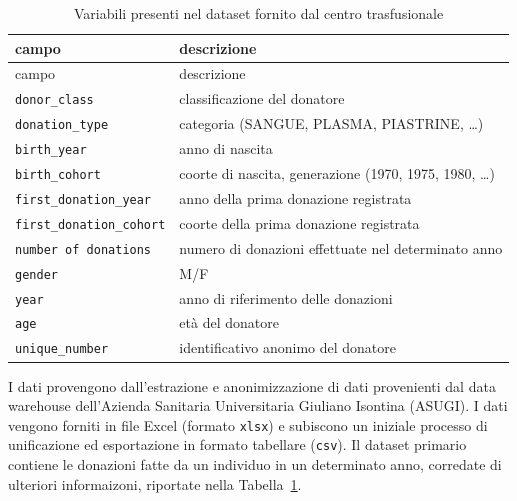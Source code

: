 \documentclass[
  italian,
  a4paper,
  a4paper,
  twoside,
  open=right,
  12pt]{scrbook}
\theoremstyle{definition}
\theoremstyle{remark}
\begin{document}
\begin{longtable}[]{@{}
  >{\raggedright\arraybackslash}p{}
  >{\raggedright\arraybackslash}p{}@{}}
\caption{Variabili presenti nel dataset fornito dal centro
trasfusionale}\label{tbl-struttura_dati}\tabularnewline
\toprule\noalign{}
\begin{minipage}[b]{\linewidth}\raggedright
campo
\end{minipage} & \begin{minipage}[b]{\linewidth}\raggedright
descrizione
\end{minipage} \\
\midrule\noalign{}
\endfirsthead
\toprule\noalign{}
\begin{minipage}[b]{\linewidth}\raggedright
campo
\end{minipage} & \begin{minipage}[b]{\linewidth}\raggedright
descrizione
\end{minipage} \\
\midrule\noalign{}
\endhead
\bottomrule\noalign{}
\endlastfoot
\texttt{donor\_class} & classificazione del donatore \\
\texttt{donation\_type} & categoria (SANGUE, PLASMA, PIASTRINE,
\ldots) \\
\texttt{birth\_year} & anno di nascita \\
\texttt{birth\_cohort} & coorte di nascita, generazione (1970, 1975,
1980, \ldots) \\
\texttt{first\_donation\_year} & anno della prima donazione
registrata \\
\texttt{first\_donation\_cohort} & coorte della prima donazione
registrata \\
\texttt{number\ of\ donations} & numero di donazioni effettuate nel
determinato anno \\
\texttt{gender} & M/F \\
\texttt{year} & anno di riferimento delle donazioni \\
\texttt{age} & età del donatore \\
\texttt{unique\_number} & identificativo anonimo del donatore \\
\end{longtable}

I dati provengono dall'estrazione e anonimizzazione di dati provenienti
dal data warehouse dell'Azienda Sanitaria Universitaria Giuliano
Isontina (ASUGI). I dati vengono forniti in file Excel (formato
\texttt{xlsx}) e subiscono un iniziale processo di unificazione ed
esportazione in formato tabellare (\texttt{csv}). Il dataset primario
contiene le donazioni fatte da un individuo in un determinato anno,
corredate di ulteriori informaizoni, riportate nella
Tabella~\ref{tbl-struttura_dati}.
\end{document}
